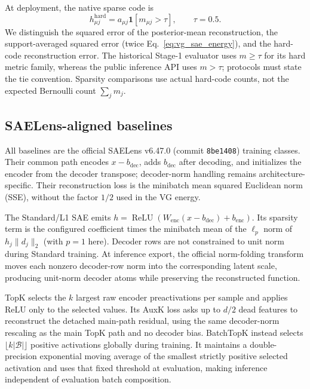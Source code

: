 At deployment, the native sparse code is
\begin{equation}
  h^{\mathrm{hard}}_{\mu j}
  =a_{\mu j}\mathbf{1}[m_{\mu j}>\tau],\qquad \tau=0.5.
\end{equation}
We distinguish the squared error of the posterior-mean reconstruction,
the support-averaged squared error (twice Eq.~\eqref{eq:vg_sae_energy}), and
the hard-code reconstruction error. The historical Stage-1 evaluator uses
$m\geq\tau$ for its hard metric family, whereas the public inference API uses
$m>\tau$; protocols must state the tie convention. Sparsity comparisons use
actual hard-code counts, not the expected Bernoulli count $\sum_jm_j$.

\subsection{SAELens-aligned baselines}
\label{sec:saelens_baselines}

All baselines are the official SAELens v6.47.0 (commit \texttt{8be1408})
training classes.  Their common path encodes $x-b_{\mathrm{dec}}$, adds
$b_{\mathrm{dec}}$ after decoding, and initializes the encoder from the decoder
transpose; decoder-norm handling remains architecture-specific.  Their
reconstruction loss is the minibatch mean squared Euclidean norm (SSE), without
the factor $1/2$ used in the VG energy.

The Standard/L1 SAE emits
$h=\operatorname{ReLU}(W_{\mathrm{enc}}(x-b_{\mathrm{dec}})+b_{\mathrm{enc}})$.
Its sparsity term is the configured coefficient times the minibatch mean of the
$\ell_p$ norm of $h_j\lVert d_j\rVert_2$ (with $p=1$ here).  Decoder rows are
not constrained to unit norm during Standard training.  At inference export,
the official norm-folding transform moves each nonzero decoder-row norm into
the corresponding latent scale, producing unit-norm decoder atoms while
preserving the reconstructed function.

TopK selects the $k$ largest raw encoder preactivations per sample and applies
ReLU only to the selected values.  Its AuxK loss asks up to $d/2$ dead features
to reconstruct the detached main-path residual, using the same decoder-norm
rescaling as the main TopK path and no decoder bias.  BatchTopK instead selects
$\lfloor k|\mathcal{B}|\rfloor$ positive activations globally during training.
It maintains a double-precision exponential moving average of the smallest
strictly positive selected activation and uses that fixed threshold at
evaluation, making inference independent of evaluation batch composition.

